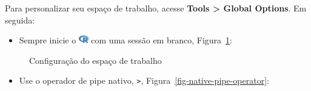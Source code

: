 \documentclass[
  letterpaper,
]{book}
\providecommand{\tightlist}{%
  \setlength{\itemsep}{0pt}\setlength{\parskip}{0pt}}\usepackage{longtable,booktabs,array}
\theoremstyle{definition}
\theoremstyle{plain}
\theoremstyle{remark}
\begin{document}
Para personalizar seu espaço de trabalho, acesse \textbf{Tools
\textgreater{} Global Options}. Em seguida:

\begin{itemize}
\tightlist
\item
  Sempre inicie o
  \includegraphics[width=1.13em,height=1em]{getting_started_with_r_files/figure-pdf/fa-icon-9b00320707d42527dde67262afb33ded.pdf}
  com uma sessão em branco, Figura~\ref{fig-r-blank-slate}:
\end{itemize}

\begin{figure}


\caption{\label{fig-r-blank-slate}Configuração do espaço de trabalho}

\end{figure}%

\begin{itemize}
\tightlist
\item
  Use o operador de pipe nativo, \texttt{\textbar{}\textgreater{}},
  Figura~\ref{fig-native-pipe-operator}:
\end{itemize}
\end{document}
